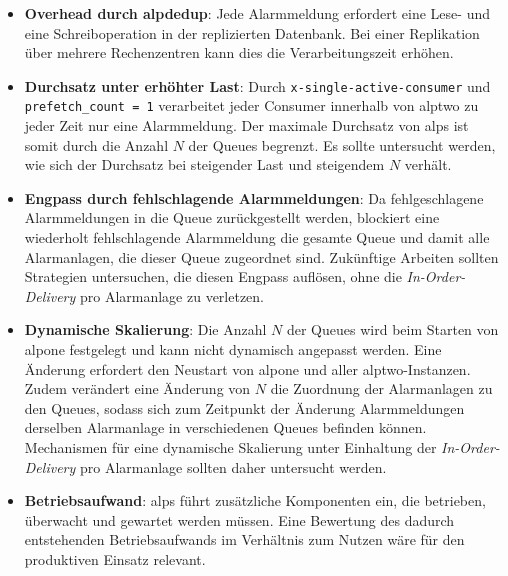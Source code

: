 \begin{itemize}
    \item \textbf{Overhead durch \gls{alpdedup}}: Jede Alarmmeldung erfordert eine Lese- und eine Schreiboperation in der replizierten Datenbank. Bei einer Replikation über mehrere Rechenzentren kann dies die Verarbeitungszeit erhöhen.

    \item \textbf{Durchsatz unter erhöhter Last}: Durch \texttt{x-single-active-\allowbreak consumer} und \texttt{prefetch\_count = 1} verarbeitet jeder Consumer innerhalb von \gls{alptwo} zu jeder Zeit nur eine Alarmmeldung. Der maximale Durchsatz von \gls{alps} ist somit durch die Anzahl $N$ der Queues begrenzt. Es sollte untersucht werden, wie sich der Durchsatz bei steigender Last und steigendem $N$ verhält.

    \item \textbf{Engpass durch fehlschlagende Alarmmeldungen}: Da fehlgeschlagene Alarmmeldungen in die Queue zurückgestellt werden, blockiert eine wiederholt fehlschlagende Alarmmeldung die gesamte Queue und damit alle Alarmanlagen, die dieser Queue zugeordnet sind. Zukünftige Arbeiten sollten Strategien untersuchen, die diesen Engpass auflösen, ohne die \textit{In-Order-Delivery} pro Alarmanlage zu verletzen.

    \item \textbf{Dynamische Skalierung}: Die Anzahl $N$ der Queues wird beim Starten von \gls{alpone} festgelegt und kann nicht dynamisch angepasst werden. Eine Änderung erfordert den Neustart von \gls{alpone} und aller \gls{alptwo}-Instanzen. Zudem verändert eine Änderung von $N$ die Zuordnung der Alarmanlagen zu den Queues, sodass sich zum Zeitpunkt der Änderung Alarmmeldungen derselben Alarmanlage in verschiedenen Queues befinden können. Mechanismen für eine dynamische Skalierung unter Einhaltung der \textit{In-Order-Delivery} pro Alarmanlage sollten daher untersucht werden.

    \item \textbf{Betriebsaufwand}: \gls{alps} führt zusätzliche Komponenten ein, die betrieben, überwacht und gewartet werden müssen. Eine Bewertung des dadurch entstehenden Betriebsaufwands im Verhältnis zum Nutzen wäre für den produktiven Einsatz relevant.
\end{itemize}